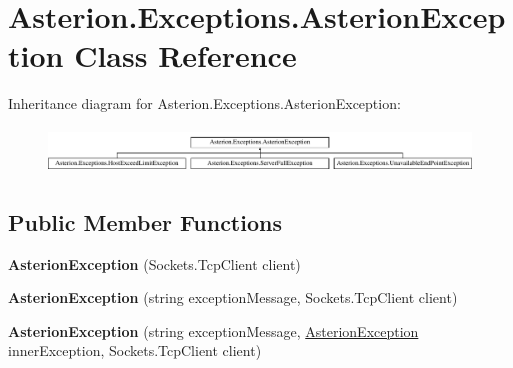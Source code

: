 \hypertarget{classAsterion_1_1Exceptions_1_1AsterionException}{\section{Asterion.\-Exceptions.\-Asterion\-Exception Class Reference}
\label{classAsterion_1_1Exceptions_1_1AsterionException}
}
Inheritance diagram for Asterion.\-Exceptions.\-Asterion\-Exception\-:\begin{figure}[H]
\begin{center}
\leavevmode
\includegraphics[height=1.216069cm]{classAsterion_1_1Exceptions_1_1AsterionException}
\end{center}
\end{figure}
\subsection*{Public Member Functions}
\begin{DoxyCompactItemize}
\item 
\hypertarget{classAsterion_1_1Exceptions_1_1AsterionException_aac3fe4529caa8cf890cb6d92e80cb4e9}{{\bfseries Asterion\-Exception} (Sockets.\-Tcp\-Client client)}\label{classAsterion_1_1Exceptions_1_1AsterionException_aac3fe4529caa8cf890cb6d92e80cb4e9}

\item 
\hypertarget{classAsterion_1_1Exceptions_1_1AsterionException_a68bddf8b0218094b0398cda4596379e3}{{\bfseries Asterion\-Exception} (string exception\-Message, Sockets.\-Tcp\-Client client)}\label{classAsterion_1_1Exceptions_1_1AsterionException_a68bddf8b0218094b0398cda4596379e3}

\item 
\hypertarget{classAsterion_1_1Exceptions_1_1AsterionException_a959ac26a28b378ff7c59eac2ec394c5f}{{\bfseries Asterion\-Exception} (string exception\-Message, \hyperlink{classAsterion_1_1Exceptions_1_1AsterionException}{Asterion\-Exception} inner\-Exception, Sockets.\-Tcp\-Client client)}\label{classAsterion_1_1Exceptions_1_1AsterionException_a959ac26a28b378ff7c59eac2ec394c5f}

\end{DoxyCompactItemize}
